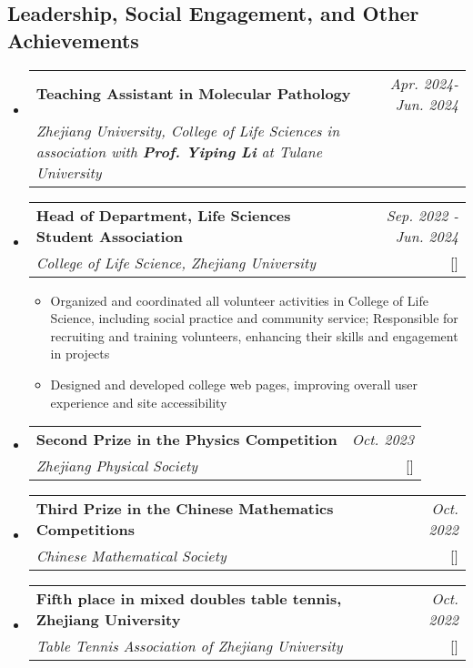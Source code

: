 \documentclass[a4paper,11pt]{article}
\makeatletter
\newcommand{\resumeProject}[4]{
\vspace{0.5mm}\item
    \begin{tabular*}{0.98\textwidth}[t]{l@{\extracolsep{\fill}}r}
        \textbf{#1} & \textit{\footnotesize{#3}} \\
        \footnotesize{\textit{#2}} & \footnotesize{#4}
    \end{tabular*}
    \vspace{-2.4mm}
}
\newcommand{\resumeSubHeadingListStart}{\begin{itemize}[leftmargin=*,labelsep=1mm]}
\newcommand{\resumeItemListStart}{\begin{itemize}[leftmargin=*,labelsep=1mm,itemsep=0.5mm]}
\newcommand{\resumeSubHeadingListEnd}{\end{itemize}\vspace{2mm}}
\newcommand{\resumeItemListEnd}{\end{itemize}\vspace{-2mm}}
\makeatother
\begin{document}
\begin{justify}
\section{\textbf{Leadership, Social Engagement, and Other Achievements}}
\vspace{-0.4mm}
\resumeSubHeadingListStart
\resumeProject
{Teaching Assistant in Molecular Pathology}
{Zhejiang University, College of Life Sciences in association with \textbf{Prof. Yiping Li} at Tulane University}
{Apr. 2024- Jun. 2024}
{}
{}
\resumeProject
  {Head of Department, Life Sciences Student Association}
  {College of Life Science, Zhejiang University}
  {Sep. 2022 - Jun. 2024}
  {{}[\href{https://qiushibio.github.io/}{\textcolor{darkblue}{\faIcon{globe}}}]}
\resumeItemListStart
  \item Organized and coordinated all volunteer activities in College of Life Science, including social practice and community service; Responsible for recruiting and training volunteers, enhancing their skills and engagement in projects
  \item Designed and developed college web pages, improving overall user experience and site accessibility
\resumeItemListEnd

\resumeProject
  {Second Prize in the Physics Competition}
  {Zhejiang Physical Society}
  {Oct. 2023}
  {{}[\href{https://organization-b-link.com}{\textcolor{darkblue}{\faIcon{globe}}}]}
\resumeProject
  {Third Prize in the Chinese Mathematics Competitions}
  {Chinese Mathematical Society}
  {Oct. 2022}
  {{}[\href{https://organization-b-link.com}{\textcolor{darkblue}{\faIcon{globe}}}]}
\resumeProject
  {Fifth place in mixed doubles table tennis, Zhejiang University}
  {Table Tennis Association of Zhejiang University}
  {Oct. 2022}
  {{}[\href{https://organization-b-link.com}{\textcolor{darkblue}{\faIcon{globe}}}]}


\resumeSubHeadingListEnd

\vspace{-6mm}



\end{justify}
\end{document}

